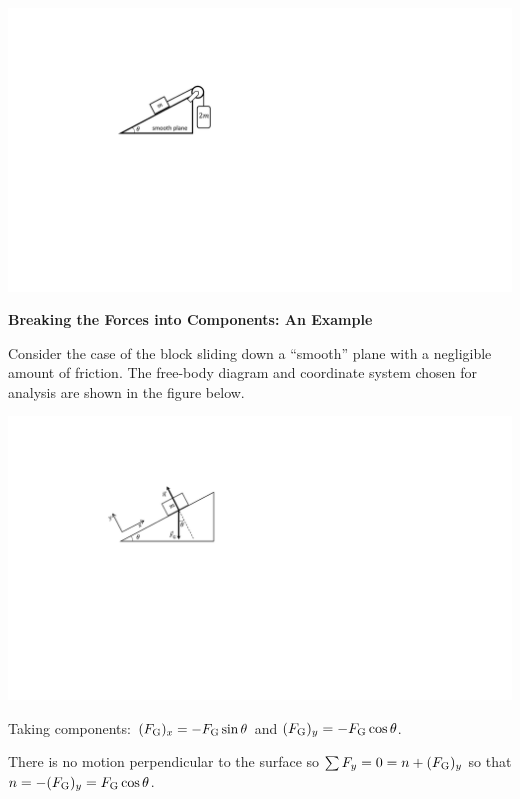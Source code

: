 \vspace{0.3cm}
{\par\centering \includegraphics{friction/smooth_plane_pulley.pdf} \par}
\vspace{0.3cm}

\textbf{Breaking the Forces into Components: An Example} 

Consider the case of the block sliding down a ``smooth'' plane
with a negligible amount of friction. The free-body diagram and coordinate system
chosen for analysis are shown in the figure below.

\vspace{0.3cm}
{\par\centering \includegraphics{friction/force_diagram2.pdf} \par}
\vspace{0.3cm}

Taking components: \( (F_{\rm G})_{x}  = -F_{\rm G} \sin  \theta  \) and \((F_{\rm G})_{y} = -F_{\rm G}
\cos  \theta  \).

There is no motion perpendicular to the surface so \( \sum F_y
= 0 = n + (F_{\rm G})_{y} \) so that $n = -(F_{\rm G})_{y}  = F_{\rm G} \cos \theta$.

